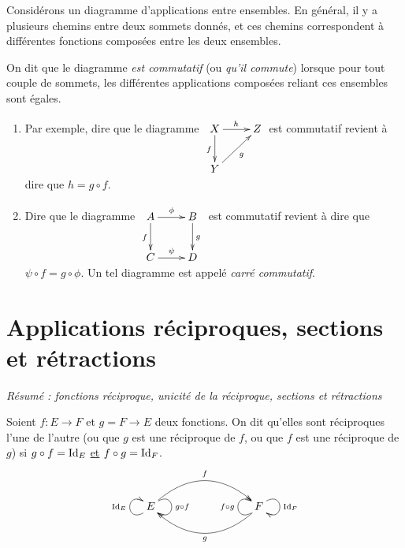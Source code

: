 \begin{definition}
Considérons un diagramme d'applications entre ensembles. En général, il y a plusieurs chemins entre deux sommets donnés, et ces chemins correspondent à différentes fonctions composées entre les deux ensembles.

On dit que le diagramme \emph{est commutatif} (ou \emph{qu'il commute}) lorsque pour tout couple de sommets, les différentes applications composées reliant ces ensembles sont égales.
\end{definition}

\begin{exemple}
\begin{enumerate}
\item  Par exemple, dire que le diagramme
$
\xymatrix{
X \ar[d]_{f} \ar[r]^{h}& Z \\
Y \ar[ur]_{g}& 
}
$
est commutatif revient à dire que $h = g\circ f$.
\item Dire que le diagramme 
$\xymatrix{
A \ar[r]^{\phi} \ar[d]_{f} & B \ar[d]^{g}\\
C \ar[r]^{\psi}& D 
}$
est commutatif revient à dire que $\psi\circ f = g \circ \phi$. Un tel diagramme est appelé \emph{carré commutatif}.
\end{enumerate}
\end{exemple}





\section{Applications réciproques, sections et rétractions}

\emph{Résumé : fonctions réciproque, unicité de la réciproque, sections et rétractions}


\begin{definition}
Soient $f : E\to F$ et $g = F\to E$ deux fonctions. On dit qu'elles sont réciproques l'une de l'autre (ou que $g$ est une réciproque de $f$, ou que $f$ est une réciproque de $g$) si $g\circ f = \operatorname{Id}_E$ \underline{et} $f\circ g = \operatorname{Id}_F$. 
\[
\xymatrix{
 E \ar@(dl,ul)^{\Id_E} \ar@/^2pc/[rrr]^{f} \ar@(ur,dr)^{g\circ f} 
& & & 
\ar@/^2pc/[lll]^{g} \ar@(dl,ul)^{f\circ g} F \ar@(ur,dr)^{\Id_F}
}
\]
\end{definition}



